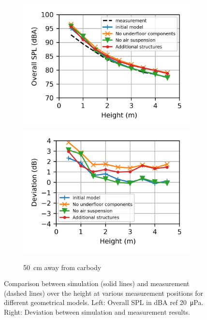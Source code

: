 \begin{figure}
\begin{subfigure}[b]{\textwidth}
		\includegraphics{fig/chap5/geometry_variation/overall_SPL/pos_f.png}
		\hfill
		\includegraphics{fig/chap5/geometry_variation/overall_SPL/pos_f_deviation.png}
		\caption{\SI{50}{\centi\meter} away from carbody}
	\end{subfigure}
	\caption{Comparison between simulation (solid lines) and measurement (dashed lines) over the height at various measurement positions for different geometrical models. Left: Overall SPL in dBA ref \SI{20}{\micro\pascal}. Right: Deviation between simulation and measurement results.}
	\label{fig:overall_SPL_geometry}
\end{figure}

